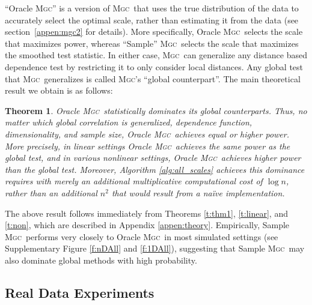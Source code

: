 \documentclass[11pt]{article}
\providecommand{\sct}[1]{{\normalfont\textsc{#1}}}
\newcommand{\Mgc}{\sct{Mgc}}
\newtheorem{thm}{Theorem}
\begin{document}
``Oracle \Mgc'' is a version of \Mgc~that uses the true distribution of the data to accurately select the optimal scale, rather than estimating it from the data (see section~\ref{appen:mgc2} for details). More specifically, Oracle \Mgc~selects the scale that maximizes power, whereas ``Sample'' \Mgc~selects the scale that maximizes the smoothed test statistic. 
In either case,  \Mgc~can generalize any distance based dependence test by restricting it to only consider local distances.  Any global test that \Mgc~generalizes is called \Mgc's ``global counterpart''.  The main theoretical result we obtain is as follows:
% 
\begin{thm} \label{t:dominate}
Oracle \Mgc~statistically dominates its global counterparts. Thus, no matter which global correlation is generalized, dependence function, dimensionality, and sample size, Oracle \Mgc~achieves equal or higher power.  More precisely, in \emph{linear} settings Oracle \Mgc~achieves the same power as the global test, and in various nonlinear settings, Oracle \Mgc~achieves {higher} power than the global test. Moreover, Algorithm \ref{alg:all_scales} achieves this dominance requires with merely an additional multiplicative computational cost of $\log n$, rather than an additional $n^2$ that would result from a na\"ive implementation.
\end{thm}

The above result follows immediately from Theorems \ref{t:thm1}, \ref{t:linear}, and \ref{t:non}, which are described in Appendix \ref{appen:theory}.   Empirically, Sample \Mgc~performs very closely to Oracle \Mgc~in most simulated settings (see Supplementary Figure \ref{f:nDAll} and \ref{f:1DAll}), suggesting that Sample \Mgc~may also dominate global methods with high probability.

\subsection*{Real Data Experiments}
\label{numer3}
\end{document}
